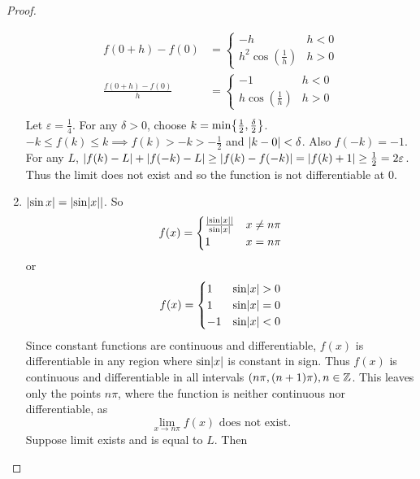 \documentclass[12pt]{article}
\begin{document}
\begin{proof}
\begin{enumerate}[label=(\alph*)]
        \begin{align*}
            f(0 + h) - f(0) &= 
            \begin{cases}
                -h & h < 0 \\
                h^{2} \cos(\frac{1}{h}) & h > 0
            \end{cases} \\
            \frac{f(0 + h) - f(0)}{h} &=
            \begin{cases}
                -1 & h < 0 \\
                h \cos(\frac{1}{h}) & h > 0
            \end{cases} \\
        \end{align*}
        Let $\varepsilon = \frac{1}{4}$.
        For any $\delta > 0$, choose $k = \min \set{\frac{1}{2}, \frac{\delta}{2}}$.
        $-k \leq f(k) \leq k \implies f(k) > -k > -\frac{1}{2}$ and $\abs{k - 0} < \delta$.
        Also $f(-k) = -1$.
        For any $L$, $\abs{f(k) - L} + \abs{f(-k) - L} \geq \abs{f(k) - f(-k)} = \abs{f(k) + 1} \geq \frac{1}{2} = 2 \varepsilon$.
        Thus the limit does not exist and so the function is not differentiable at $0$.
    
        \item $\abs{\sin x} = \abs{\sin \abs{x}}$. So \[
            f(x) = 
            \begin{cases}
                \frac{\abs{\sin \abs{x}}}{\sin \abs{x}} & x \neq n \pi \\
                1 & x = n \pi
            \end{cases}
        \] or \[
            f(x) =
            \begin{cases}
                1 & \sin \abs{x} > 0 \\
                1 & \sin \abs{x} = 0 \\
                -1 & \sin \abs{x} < 0
            \end{cases}
        \] Since constant functions are continuous and differentiable, $f(x)$ is differentiable in any region where $\sin \abs{x}$ is constant in sign.
        Thus $f(x)$ is continuous and differentiable in all intervals $(n\pi, (n+1)\pi), n \in \mathbb{Z}$.
        This leaves only the points $n\pi$, where the function is neither continuous nor differentiable, as \[
            \lim_{x \to n\pi} f(x) \text{ does not exist.}
        \] Suppose limit exists and is equal to $L$. Then 
    \end{enumerate}
\end{proof}
\end{document}
